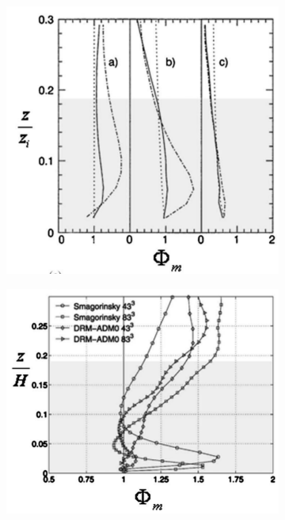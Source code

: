 \begin{figure}
\centering
        \begin{subfigure}[t]{0.42\textwidth}
                \includegraphics[width=\linewidth]{Figure/sullivan.png}
                \caption{}
                \label{fig:phi1}
        \end{subfigure}%
        \centering
        \begin{subfigure}[t]{0.475\textwidth}
                \includegraphics[width=\linewidth]{Figure/chow.png}

\end{subfigure}
\end{figure}
